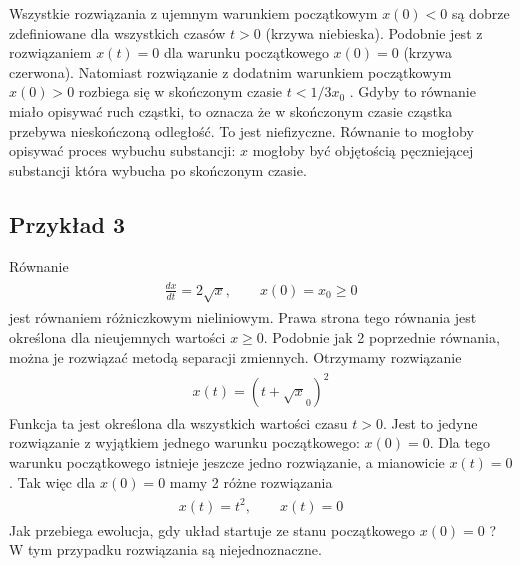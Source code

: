 \documentclass[a4paper,12pt,polish]{sphinxmanual}
\begin{document}
Wszystkie rozwiązania z ujemnym warunkiem początkowym $x(0) < 0$ są dobrze zdefiniowane dla wszystkich czasów $t>0$ (krzywa niebieska). Podobnie jest z rozwiązaniem $x(t) = 0$ dla warunku początkowego $x(0)=0$ (krzywa czerwona). Natomiast rozwiązanie z  dodatnim warunkiem początkowym $x(0) > 0$ rozbiega się w skończonym czasie $t< 1/3x_0$ . Gdyby to równanie miało opisywać ruch cząstki, to oznacza że w skończonym czasie cząstka przebywa nieskończoną odległość. To jest niefizyczne. Równanie  to mogłoby   opisywać proces wybuchu  substancji: $x$ mogłoby być objętością pęczniejącej substancji która  wybucha po skończonym czasie.


\subsection{Przykład 3}
\label{ch1/chI012:przyklad-3}
Równanie
\label{ch1/chI012:equation-eqn5}\begin{gather}
\begin{split}\frac{dx}{dt}=  2 \sqrt x, \qquad x(0) = x_0 \ge 0\end{split}\label{ch1/chI012-eqn5}
\end{gather}
jest równaniem różniczkowym nieliniowym.  Prawa strona tego równania jest określona dla nieujemnych wartości $x \ge 0$.  Podobnie jak  2 poprzednie równania, można  je rozwiązać metodą separacji zmiennych. Otrzymamy rozwiązanie
\label{ch1/chI012:equation-eqn6}\begin{gather}
\begin{split}x(t) = (t +  \sqrt x_0)^2\end{split}\label{ch1/chI012-eqn6}
\end{gather}
Funkcja ta jest określona dla wszystkich wartości czasu $t >0$.   Jest to jedyne  rozwiązanie  z wyjątkiem jednego warunku początkowego: $x(0) = 0$. Dla tego warunku początkowego istnieje jeszcze jedno rozwiązanie, a mianowicie $x(t) = 0$. Tak więc dla $x(0) = 0$ mamy  2 różne rozwiązania
\label{ch1/chI012:equation-eqn7}\begin{gather}
\begin{split}x(t) = t^2, \qquad x(t) = 0\end{split}\label{ch1/chI012-eqn7}
\end{gather}
Jak przebiega ewolucja, gdy układ startuje ze stanu początkowego $x(0) = 0$ ? W tym przypadku rozwiązania są niejednoznaczne.
\end{document}
